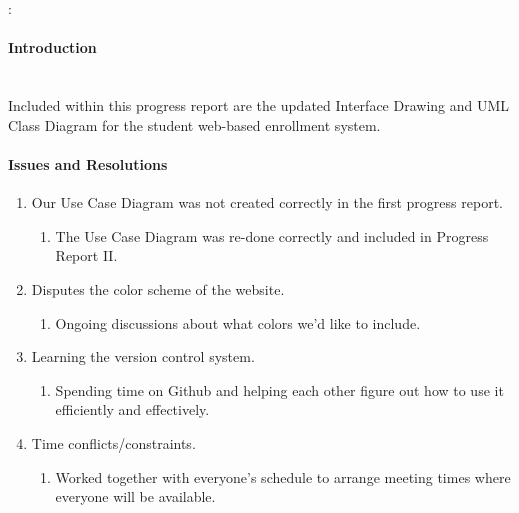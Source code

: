 \documentclass[12pt,oneside]{article}
\begin{document}


\begin{center}
{\large\bf \projectTitle \\ ~\\}
{\teamName: \\\teamMembers}
\end{center}



\doublespace
\paragraph{Introduction}
\hfill \\
Included within this progress report are the updated Interface Drawing and UML
Class Diagram for the student web-based enrollment system.
\singlespace

\paragraph{Issues and Resolutions}
\begin{enumerate}
    \item Our Use Case Diagram was not created correctly in the first progress report.
        \begin{enumerate}
            \item The Use Case Diagram was re-done correctly and included in Progress Report II.
        \end{enumerate}
    \item Disputes the color scheme of the website.
        \begin{enumerate}
            \item Ongoing discussions about what colors we'd like to include.
        \end{enumerate}
    \item Learning the version control system.
        \begin{enumerate}
            \item Spending time on Github and helping each other figure out how to use it
                  efficiently and effectively.
        \end{enumerate}
    \item Time conflicts/constraints.
        \begin{enumerate}
            \item Worked together with everyone's schedule to arrange meeting times where everyone
                  will be available.
        \end{enumerate}
\end{enumerate}
\end{document}
